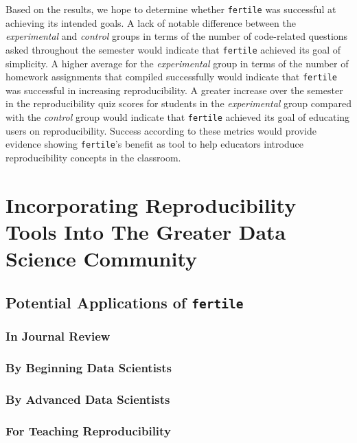 \documentclass[12pt,twoside]{reedthesis}
\begin{document}
Based on the results, we hope to determine whether \texttt{fertile} was
successful at achieving its intended goals. A lack of notable difference
between the \emph{experimental} and \emph{control} groups in terms of
the number of code-related questions asked throughout the semester would
indicate that \texttt{fertile} achieved its goal of simplicity. A higher
average for the \emph{experimental} group in terms of the number of
homework assignments that compiled successfully would indicate that
\texttt{fertile} was successful in increasing reproducibility. A greater
increase over the semester in the reproducibility quiz scores for
students in the \emph{experimental} group compared with the
\emph{control} group would indicate that \texttt{fertile} achieved its
goal of educating users on reproducibility. Success according to these
metrics would provide evidence showing \texttt{fertile}'s benefit as
tool to help educators introduce reproducibility concepts in the
classroom.

\chapter{Incorporating Reproducibility Tools Into The Greater Data
Science Community}\label{applications}

\section{\texorpdfstring{Potential Applications of
\texttt{fertile}}{Potential Applications of fertile}}\label{potential-applications-of-fertile}

\subsection{In Journal Review}\label{in-journal-review}

\subsection{By Beginning Data
Scientists}\label{by-beginning-data-scientists}

\subsection{By Advanced Data
Scientists}\label{by-advanced-data-scientists}

\subsection{For Teaching
Reproducibility}\label{for-teaching-reproducibility}
\end{document}
